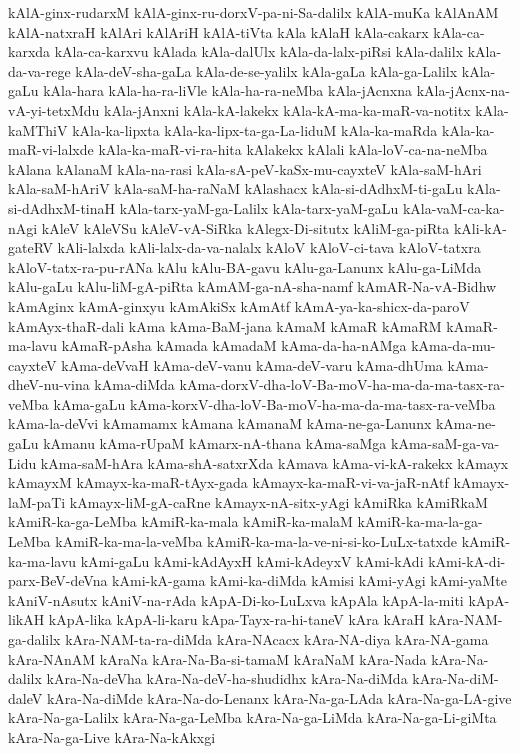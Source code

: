 {kAlA-ginx-rudarxM
kAlA-ginx-ru-dorxV-pa-ni-Sa-dalilx
kAlA-muKa
kAlAnAM
kAlA-natxraH
kAlAri
kAlAriH
kAlA-tiVta
kAla
kAlaH
kAla-cakarx
kAla-ca-karxda
kAla-ca-karxvu
kAlada
kAla-dalUlx
kAla-da-lalx-piRsi
kAla-dalilx
kAla-da-va-rege
kAla-deV-sha-gaLa
kAla-de-se-yalilx
kAla-gaLa
kAla-ga-Lalilx
kAla-gaLu
kAla-hara
kAla-ha-ra-liVle
kAla-ha-ra-neMba
kAla-jAcnxna
kAla-jAcnx-na-vA-yi-tetxMdu
kAla-jAnxni
kAla-kA-lakekx
kAla-kA-ma-ka-maR-va-notitx
kAla-kaMThiV
kAla-ka-lipxta
kAla-ka-lipx-ta-ga-La-liduM
kAla-ka-maRda
kAla-ka-maR-vi-lalxde
kAla-ka-maR-vi-ra-hita
kAlakekx
kAlali
kAla-loV-ca-na-neMba
kAlana
kAlanaM
kAla-na-rasi
kAla-sA-peV-kaSx-mu-cayxteV
kAla-saM-hAri
kAla-saM-hAriV
kAla-saM-ha-raNaM
kAlashacx
kAla-si-dAdhxM-ti-gaLu
kAla-si-dAdhxM-tinaH
kAla-tarx-yaM-ga-Lalilx
kAla-tarx-yaM-gaLu
kAla-vaM-ca-ka-nAgi
kAleV
kAleVSu
kAleV-vA-SiRka
kAlegx-Di-situtx
kAliM-ga-piRta
kAli-kA-gateRV
kAli-lalxda
kAli-lalx-da-va-nalalx
kAloV
kAloV-ci-tava
kAloV-tatxra
kAloV-tatx-ra-pu-rANa
kAlu
kAlu-BA-gavu
kAlu-ga-Lanunx
kAlu-ga-LiMda
kAlu-gaLu
kAlu-liM-gA-piRta
kAmAM-ga-nA-sha-namf
kAmAR-Na-vA-Bidhw
kAmAginx
kAmA-ginxyu
kAmAkiSx
kAmAtf
kAmA-ya-ka-shicx-da-paroV
kAmAyx-thaR-dali
kAma
kAma-BaM-jana
kAmaM
kAmaR
kAmaRM
kAmaR-ma-lavu
kAmaR-pAsha
kAmada
kAmadaM
kAma-da-ha-nAMga
kAma-da-mu-cayxteV
kAma-deVvaH
kAma-deV-vanu
kAma-deV-varu
kAma-dhUma
kAma-dheV-nu-vina
kAma-diMda
kAma-dorxV-dha-loV-Ba-moV-ha-ma-da-ma-tasx-ra-veMba
kAma-gaLu
kAma-korxV-dha-loV-Ba-moV-ha-ma-da-ma-tasx-ra-veMba
kAma-la-deVvi
kAmamamx
kAmana
kAmanaM
kAma-ne-ga-Lanunx
kAma-ne-gaLu
kAmanu
kAma-rUpaM
kAmarx-nA-thana
kAma-saMga
kAma-saM-ga-va-Lidu
kAma-saM-hAra
kAma-shA-satxrXda
kAmava
kAma-vi-kA-rakekx
kAmayx
kAmayxM
kAmayx-ka-maR-tAyx-gada
kAmayx-ka-maR-vi-va-jaR-nAtf
kAmayx-laM-paTi
kAmayx-liM-gA-caRne
kAmayx-nA-sitx-yAgi
kAmiRka
kAmiRkaM
kAmiR-ka-ga-LeMba
kAmiR-ka-mala
kAmiR-ka-malaM
kAmiR-ka-ma-la-ga-LeMba
kAmiR-ka-ma-la-veMba
kAmiR-ka-ma-la-ve-ni-si-ko-LuLx-tatxde
kAmiR-ka-ma-lavu
kAmi-gaLu
kAmi-kAdAyxH
kAmi-kAdeyxV
kAmi-kAdi
kAmi-kA-di-parx-BeV-deVna
kAmi-kA-gama
kAmi-ka-diMda
kAmisi
kAmi-yAgi
kAmi-yaMte
kAniV-nAsutx
kAniV-na-rAda
kApA-Di-ko-LuLxva
kApAla
kApA-la-miti
kApA-likAH
kApA-lika
kApA-li-karu
kApa-Tayx-ra-hi-taneV
kAra
kAraH
kAra-NAM-ga-dalilx
kAra-NAM-ta-ra-diMda
kAra-NAcacx
kAra-NA-diya
kAra-NA-gama
kAra-NAnAM
kAraNa
kAra-Na-Ba-si-tamaM
kAraNaM
kAra-Nada
kAra-Na-dalilx
kAra-Na-deVha
kAra-Na-deV-ha-shudidhx
kAra-Na-diMda
kAra-Na-diM-daleV
kAra-Na-diMde
kAra-Na-do-Lenanx
kAra-Na-ga-LAda
kAra-Na-ga-LA-give
kAra-Na-ga-Lalilx
kAra-Na-ga-LeMba
kAra-Na-ga-LiMda
kAra-Na-ga-Li-giMta
kAra-Na-ga-Live
kAra-Na-kAkxgi
}
